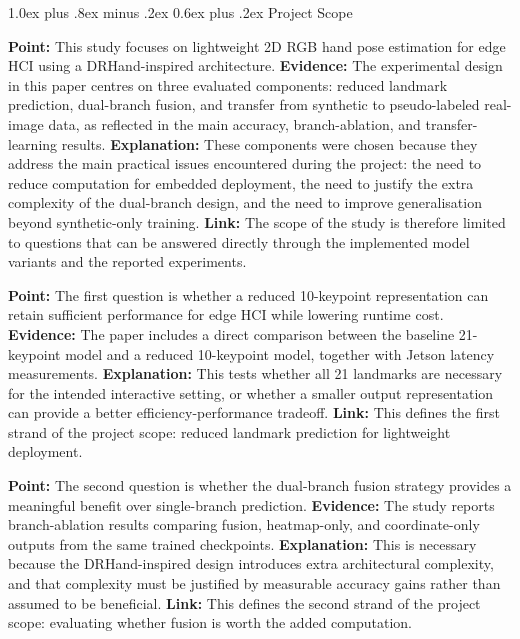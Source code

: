 \documentclass[10pt,letterpaper]{article}
\makeatletter
\renewcommand\subsection{\@startsection{subsection}{2}{\z@}%
  {1.0ex plus .8ex minus .2ex}%
  {0.6ex plus .2ex}%
  {\normalfont\itshape}}
\makeatother
\begin{document}
\subsection{Project Scope}

\noindent\textbf{Point:} This study focuses on lightweight 2D RGB hand pose estimation for edge HCI using a DRHand-inspired architecture.  
\textbf{Evidence:} The experimental design in this paper centres on three evaluated components: reduced landmark prediction, dual-branch fusion, and transfer from synthetic to pseudo-labeled real-image data, as reflected in the main accuracy, branch-ablation, and transfer-learning results.  
\textbf{Explanation:} These components were chosen because they address the main practical issues encountered during the project: the need to reduce computation for embedded deployment, the need to justify the extra complexity of the dual-branch design, and the need to improve generalisation beyond synthetic-only training.  
\textbf{Link:} The scope of the study is therefore limited to questions that can be answered directly through the implemented model variants and the reported experiments.

\medskip
\noindent\textbf{Point:} The first question is whether a reduced 10-keypoint representation can retain sufficient performance for edge HCI while lowering runtime cost.  
\textbf{Evidence:} The paper includes a direct comparison between the baseline 21-keypoint model and a reduced 10-keypoint model, together with Jetson latency measurements.  
\textbf{Explanation:} This tests whether all 21 landmarks are necessary for the intended interactive setting, or whether a smaller output representation can provide a better efficiency-performance tradeoff.  
\textbf{Link:} This defines the first strand of the project scope: reduced landmark prediction for lightweight deployment.

\medskip
\noindent\textbf{Point:} The second question is whether the dual-branch fusion strategy provides a meaningful benefit over single-branch prediction.  
\textbf{Evidence:} The study reports branch-ablation results comparing fusion, heatmap-only, and coordinate-only outputs from the same trained checkpoints.  
\textbf{Explanation:} This is necessary because the DRHand-inspired design introduces extra architectural complexity, and that complexity must be justified by measurable accuracy gains rather than assumed to be beneficial.  
\textbf{Link:} This defines the second strand of the project scope: evaluating whether fusion is worth the added computation.
\end{document}
